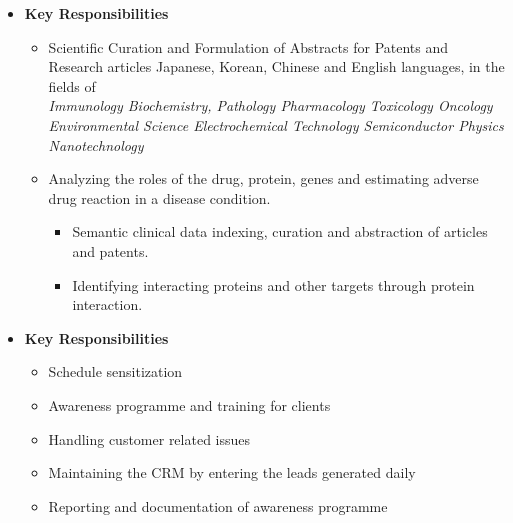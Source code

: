 \documentclass[11pt,a4paper,sans]{moderncv}        %
\begin{document}
\begin{itemize}


    \item{}
    \vspace{2mm}
    \textbf{Key Responsibilities}
    \begin{itemize}
        \item Scientific Curation and Formulation of Abstracts for Patents and Research articles   Japanese, Korean, Chinese and English languages, in the fields of \\
            \textit{\textbullet{} Immunology \textbullet{}  Biochemistry,\textbullet{}  Pathology \textbullet{}  Pharmacology\textbullet{}  Toxicology\textbullet{}  Oncology\textbullet{}   Environmental Science\textbullet{} Electrochemical Technology\textbullet{}  Semiconductor Physics \textbullet{} Nanotechnology}
    \item Analyzing the roles of the drug, protein, genes and estimating adverse drug reaction in a disease condition.
        \begin{itemize}
            \item Semantic clinical data indexing, curation and abstraction of  articles and patents.
            \item Identifying interacting proteins and other targets through protein interaction.
        \end{itemize}
    \end{itemize}

        
    \vspace{4mm}


    \item{}
    \vspace{2mm}

    \textbf{Key Responsibilities}
    \begin{itemize}
        \item Schedule sensitization
        \item Awareness programme and training for clients
        \item Handling customer related issues
        \item Maintaining the CRM by entering the leads generated daily
        \item Reporting and documentation of awareness programme
    \end{itemize}


\end{itemize}
\end{document}
